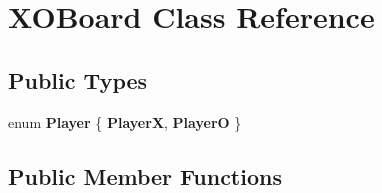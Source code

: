 \hypertarget{classXOBoard}{
\section{XOBoard Class Reference}
\label{classXOBoard}
}
\subsection*{Public Types}
\begin{DoxyCompactItemize}
\item 
enum {\bfseries Player} \{ {\bfseries PlayerX}, 
{\bfseries PlayerO}
 \}
\end{DoxyCompactItemize}
\subsection*{Public Member Functions}
